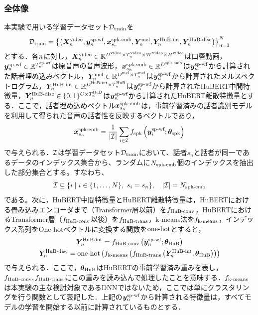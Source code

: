 \documentclass[12pt]{jarticle}
\numberwithin{equation}{section}    %
\numberwithin{figure}{section}      %
\numberwithin{table}{section}      %
\begin{document}
\subsubsection{全体像}
本実験で用いる学習データセット$\mathcal{D}_{\text{train}}$を
\begin{equation}
    \mathcal{D}_{\text{train}} = \left\{\left(\bm{X}^{\text{video}}_{n}, \bm{y}^{\text{sp-wf}}_{n}, \bm{x}^{\text{spk-emb}}_{s_{n}}, \bm{Y}^{\text{mel}}_{n}, \bm{Y}^{\text{HuB-int}}_{n}, \bm{Y}^{\text{HuB-disc}}_{n}\right)\right\}_{n = 1}^{N}
\end{equation}
とする．各$n$に対し，$\bm{X}^{\text{video}}_{n} \in \mathbb{R}^{D^{\text{video}} \times T^{\text{video}}_{n} \times W^{\text{video}} \times H^{\text{video}}}$は口唇動画， $\bm{y}^{\text{sp-wf}}_{n} \in \mathbb{R}^{T^{\text{sp-wf}}_{n}}$は原音声の音声波形，$\bm{x}^{\text{spk-emb}}_{s_{n}} \in \mathbb{R}^{D^{\text{spk-emb}}}$は$\bm{y}^{\text{sp-wf}}_{n}$から計算された話者埋め込みベクトル，$\bm{Y}^{\text{mel}}_{n} \in \mathbb{R}^{D^{\text{mel}} \times T^{\text{mel}}_{n}}$は$\bm{y}^{\text{sp-wf}}_{n}$から計算されたメルスペクトログラム，$\bm{Y}^{\text{HuB-int}}_{n} \in \mathbb{R}^{D^{\text{HuB-int}} \times T^{\text{HuB}}_{n}}$は$\bm{y}^{\text{sp-wf}}_{n}$から計算されたHuBERT中間特徴量，$\bm{Y}^{\text{HuB-disc}}_{n} \in \{0, 1\}^{C \times T^{\text{HuB}}_{n}}$は$\bm{y}^{\text{sp-wf}}_{n}$から計算されたHuBERT離散特徴量とする．ここで，話者埋め込めベクトル$\bm{x}^{\text{spk-emb}}_{s_{n}}$は，事前学習済みの話者識別モデル\cite{wan2018generalized}を利用して得られた音声の話者性を反映するベクトルであり，
\begin{equation}
    \bm{x}^{\text{spk-emb}}_{s_{n}} = \frac{1}{|\mathcal{I}|} \sum_{i \in \mathcal{I}} f_{\text{spk}}\left(\bm{y}^{\text{sp-wf}}_{i}; \bm{\theta}_{\text{spk}}\right)
\end{equation}
で与えられる．$\mathcal{I}$は学習データセット$\mathcal{D}_{\text{train}}$において、話者$s_{n}$と話者が同一であるデータのインデックス集合から、ランダムに$N_{\text{spk-emb}}$個のインデックスを抽出した部分集合とする。すなわち、
\begin{equation}
    \mathcal{I} \subseteq \{i \mid i \in \{1, \ldots, N\}, ~ s_{i} = s_{n}\}, \quad |\mathcal{I}| = N_{\text{spk-emb}}
\end{equation}
である。次に，HuBERT中間特徴量とHuBERT離散特徴量は，HuBERTにおける畳み込みエンコーダまで（Transformer層以前）を$f_{\text{HuB-conv}}$，HuBERTにおけるTransformer層（$f_{\text{HuB-conv}}$以後）を$f_{\text{HuB-trans}}$，k-means法を$f_{\text{k-means}}$，インデックス系列をOne-hotベクトルに変換する関数を$\text{one-hot}$とすると，
\begin{gather}
    \bm{Y}^{\text{HuB-int}}_{n} = f_{\text{HuB-conv}}\left(\bm{y}^{\text{sp-wf}}_{n}; \bm{\theta}_{\text{HuB}}\right) \\
    \bm{Y}^{\text{HuB-disc}}_{n} = \text{one-hot}\left(f_{\text{k-means}}\left(f_{\text{HuB-trans}}\left(\bm{Y}^{\text{HuB-int}}_{n}; \bm{\theta}_{\text{HuB}}\right)\right)\right)
\end{gather}
で与えられる．ここで，$\bm{\theta}_{\text{HuB}}$はHuBERTの事前学習済み重みを表し，$f_{\text{HuB-conv}}, f_{\text{HuB-trans}}$にこの重みを読み込んで処理したことを意味する．$f_{\text{k-means}}$は本実験の主な検討対象であるDNNではないため，ここでは単にクラスタリングを行う関数として表記した．上記の$\bm{y}^{\text{sp-wf}}_{n}$から計算される特徴量は，すべてモデルの学習を開始する以前に計算されているものとする．
\end{document}
